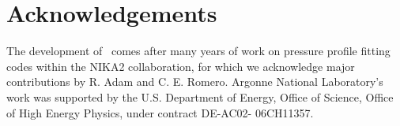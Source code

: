 \section*{Acknowledgements}

\small
The development of \panco\ comes after many years of work on pressure profile fitting codes within the NIKA2 collaboration, for which we acknowledge major contributions by R. Adam and C. E. Romero.
Argonne National Laboratory’s work was supported by the U.S. Department of Energy, Office of Science, Office of High Energy Physics, under contract DE-AC02- 06CH11357.
\normalsize